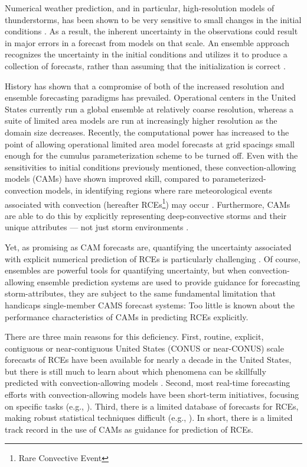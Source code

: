 Numerical weather prediction, and in particular, high-resolution models of thunderstorms, has been shown to be very sensitive to small changes in the initial conditions \citep{Lorenz1963, Lorenz1965, Lorenz1968, Brooks1992a, Brooks1992b}.
As a result, the inherent uncertainty in the observations could result in major errors in a forecast from models on that scale.
An ensemble approach recognizes the uncertainty in the initial conditions and utilizes it to produce a collection of forecasts, rather than assuming that the initialization is correct \citep{Brooks1992a}.


History has shown that a compromise of both of the increased resolution and ensemble forecasting paradigms has prevailed.
Operational centers in the United States currently run a global ensemble at relatively coarse resolution, whereas a suite of limited area models are run at increasingly higher resolution as the domain size decreases.
Recently, the computational power has increased to the point of allowing operational limited area model forecasts at grid spacings small enough for the cumulus parameterization scheme to be turned off.
Even with the sensitivities to initial conditions previously mentioned, these convection-allowing models (CAMs) have shown improved skill, compared to parameterized-convection models, in identifying regions where rare meteorological events associated with convection (hereafter RCEs\footnote{Rare Convective Event}) may occur \citep{Clark2010a}.
Furthermore, CAMs are able to do this by explicitly representing deep-convective storms and their unique attributes --- not just storm environments \citep{Kain2010}.


Yet, as promising as CAM forecasts are, quantifying the uncertainty associated with explicit numerical prediction of RCEs is particularly challenging \citep{Sobash2011}.
Of course, ensembles are powerful tools for quantifying uncertainty, but when convection-allowing ensemble prediction systems are used to provide guidance for forecasting storm-attributes, they are subject to the same fundamental limitation that handicaps single-member CAMS forecast systems: Too little is known about the performance characteristics of CAMs in predicting RCEs explicitly.


There are three main reasons for this deficiency.
First, routine, explicit, contiguous  or near-contiguous United States (CONUS or near-CONUS) scale forecasts of RCEs have been available for nearly a decade in the United States, but there is still much to learn about which phenomena can be skillfully predicted with convection-allowing models \citep{Kain2008, Kain2010}.
Second, most real-time forecasting efforts with convection-allowing models have been short-term initiatives, focusing on specific tasks (e.g., \citealp{Done2004, Weisman2008}).
Third, there is a limited database of forecasts for RCEs, making robust statistical techniques difficult (e.g., \citealp{Hamill2006}).
In short, there is a limited track record in the use of CAMs as guidance for prediction of RCEs.


